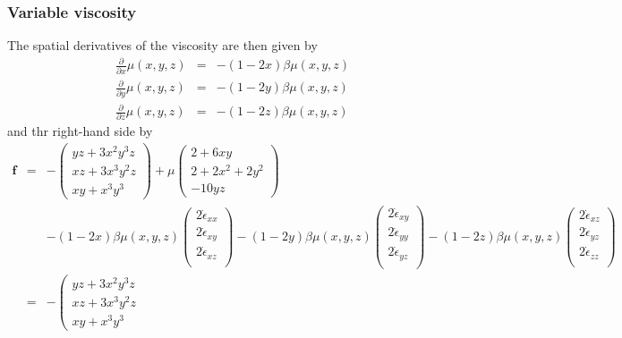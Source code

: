 \subsubsection{Variable viscosity}
The spatial derivatives of the viscosity are then given by
\begin{eqnarray}
\frac{\partial }{\partial x} \mu(x,y,z) &=& -(1-2x)\beta \mu(x,y,z) \nonumber\\
\frac{\partial }{\partial y} \mu(x,y,z) &=& -(1-2y)\beta \mu(x,y,z) \nonumber\\
\frac{\partial }{\partial z} \mu(x,y,z) &=& -(1-2z)\beta \mu(x,y,z) \nonumber
\end{eqnarray}
and thr right-hand side by
\begin{eqnarray}
{\bm f} 
&=& 
-
\left(
\begin{array}{c}
yz+3x^2y^3z\\
xz +3x^3y^2z \\
xy+x^3y^3
\end{array}
\right)
+\mu
\left(
\begin{array}{c}
2+6xy  \\
2 + 2x^2 +  2y^2 \\
-10yz 
\end{array}
\right) \\
&&
-(1-2x)\beta \mu (x,y,z)
\left(
\begin{array}{c}
2\dot{\epsilon}_{xx} \\
2\dot{\epsilon}_{xy} \\
2\dot{\epsilon}_{xz} \\
\end{array}
\right)
-(1-2y)\beta \mu (x,y,z)
\left(
\begin{array}{c}
2\dot{\epsilon}_{xy} \\
2\dot{\epsilon}_{yy} \\
2\dot{\epsilon}_{yz} \\
\end{array}
\right)
-(1-2z)\beta \mu (x,y,z)
\left(
\begin{array}{c}
2\dot{\epsilon}_{xz} \\
2\dot{\epsilon}_{yz} \\
2\dot{\epsilon}_{zz} \\
\end{array}
\right) \nonumber\\
&=& 
-
\left(
\begin{array}{c}
yz+3x^2y^3z\\
xz +3x^3y^2z \\
xy+x^3y^3
\end{array}

\end{eqnarray}
